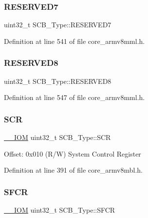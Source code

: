 \subsubsection{\texorpdfstring{R\+E\+S\+E\+R\+V\+E\+D7}{RESERVED7}}
{\footnotesize\ttfamily uint32\+\_\+t S\+C\+B\+\_\+\+Type\+::\+R\+E\+S\+E\+R\+V\+E\+D7}



Definition at line 541 of file core\+\_\+armv8mml.\+h.

\mbox{\label{struct_s_c_b___type_a59625ca4782dad641d92f0294c705985}} 
\subsubsection{\texorpdfstring{R\+E\+S\+E\+R\+V\+E\+D8}{RESERVED8}}
{\footnotesize\ttfamily uint32\+\_\+t S\+C\+B\+\_\+\+Type\+::\+R\+E\+S\+E\+R\+V\+E\+D8}



Definition at line 547 of file core\+\_\+armv8mml.\+h.

\mbox{\label{struct_s_c_b___type_a3a4840c6fa4d1ee75544f4032c88ec34}} 
\subsubsection{\texorpdfstring{S\+CR}{SCR}}
{\footnotesize\ttfamily \hyperlink{core__sc300_8h_ab6caba5853a60a17e8e04499b52bf691}{\+\_\+\+\_\+\+I\+OM} uint32\+\_\+t S\+C\+B\+\_\+\+Type\+::\+S\+CR}

Offset\+: 0x010 (R/W) System Control Register 

Definition at line 391 of file core\+\_\+armv8mbl.\+h.

\mbox{\label{struct_s_c_b___type_a82273352d2e8c7a28a7b7cbdfc3d6a75}} 
\subsubsection{\texorpdfstring{S\+F\+CR}{SFCR}}
{\footnotesize\ttfamily \hyperlink{core__sc300_8h_ab6caba5853a60a17e8e04499b52bf691}{\+\_\+\+\_\+\+I\+OM} uint32\+\_\+t S\+C\+B\+\_\+\+Type\+::\+S\+F\+CR}

